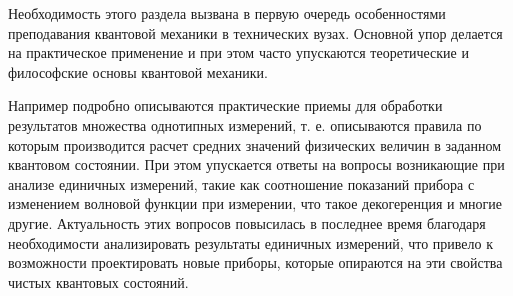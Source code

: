 Необходимость этого раздела вызвана в первую очередь особенностями
преподавания квантовой механики в технических вузах. Основной упор
делается на практическое применение и при этом часто упускаются
теоретические и философские основы квантовой механики.

Например подробно описываются практические приемы для обработки
результатов множества однотипных измерений, т. е. описываются правила
по которым производится расчет средних значений физических величин в
заданном квантовом состоянии. При этом упускается ответы на вопросы
возникающие при анализе единичных измерений, такие как соотношение
показаний прибора с изменением волновой функции при измерении, что
такое декогеренция и многие другие. Актуальность этих вопросов
повысилась в последнее время благодаря необходимости анализировать
результаты единичных измерений, что привело к возможности
проектировать новые приборы, которые опираются на эти свойства чистых
квантовых состояний. 
